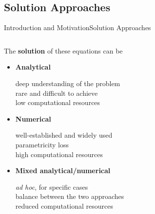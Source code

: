 \subsection{Solution Approaches}

\begin{frame}{Introduction and Motivation}{Solution Approaches}
  \begin{columns}
    \begin{column}[c]{0.45\textwidth}
      The \textbf{solution} of these equations can be \\
      \begin{itemize}[<+->]
        \item \textbf{Analytical} \\
        \begin{small}
          \qquad \textcolor{mycolor2!95!black}{deep understanding of the problem} \\
          \qquad \textcolor{mycolor2!95!black}{rare and difficult to achieve} \\
          \qquad \textcolor{mycolor5!95!black}{low computational resources}
        \end{small}
        \item \textbf{Numerical} \\
        \begin{small}
          \qquad \textcolor{mycolor5!95!black}{well-established and widely used} \\
          \qquad \textcolor{mycolor3!95!black}{parametricity loss} \\
          \qquad \textcolor{mycolor2!95!black}{high computational resources}
        \end{small}
        \item \textbf{Mixed analytical/numerical} \\
        \begin{small}
          \qquad \textcolor{mycolor3!95!black}{\emph{ad hoc}, for specific cases} \\
          \qquad \textcolor{mycolor5!95!black}{balance between the two approaches} \\
          \qquad \textcolor{mycolor5!95!black}{reduced computational resources}
        \end{small}
      \end{itemize}
    \end{column}
    \begin{column}[c]{0.6\textwidth}
      \centering
      \small
      \vspace{-2.0em}

\end{column}
\end{columns}
\end{frame}
